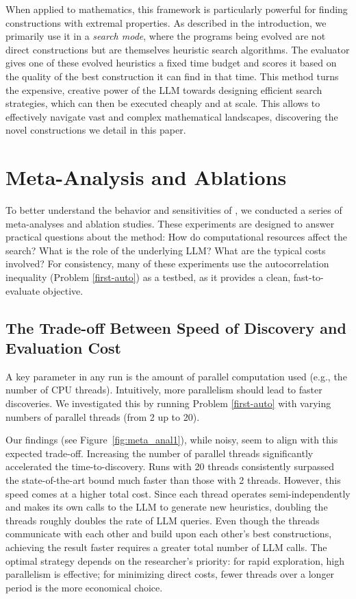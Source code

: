 When applied to mathematics, this framework is particularly powerful for finding constructions with extremal properties. As described in the introduction, we primarily use it in a \emph{search mode}, where the programs being evolved are not direct constructions but are themselves heuristic search algorithms. The evaluator gives one of these evolved heuristics a fixed time budget and scores it based on the quality of the best construction it can find in that time. This method turns the expensive, creative power of the LLM towards designing efficient search strategies, which can then be executed cheaply and at scale. This allows \AlphaEvolve to effectively navigate vast and complex mathematical landscapes, discovering the novel constructions we detail in this paper.




\section{Meta-Analysis and Ablations}



To better understand the behavior and sensitivities of \AlphaEvolve, we conducted a series of meta-analyses and ablation studies. These experiments are designed to answer practical questions about the method: How do computational resources affect the search? What is the role of the underlying LLM? What are the typical costs involved? For consistency, many of these experiments use the  autocorrelation inequality  (Problem \ref{first-auto}) as a testbed, as it provides a clean, fast-to-evaluate objective.


\subsection{The Trade-off Between Speed of Discovery and Evaluation Cost}

A key parameter in any \AlphaEvolve run is the amount of parallel computation used (e.g., the number of CPU threads). Intuitively, more parallelism should lead to faster discoveries. We investigated this by running Problem \ref{first-auto} with varying numbers of parallel threads (from 2 up to 20).

Our findings (see Figure~\ref{fig:meta_anal1}), while noisy, seem to align with this expected trade-off. Increasing the number of parallel threads significantly accelerated the time-to-discovery. Runs with 20 threads consistently surpassed the state-of-the-art bound much faster than those with 2 threads. However, this speed comes at a higher total cost. Since each thread operates semi-independently and makes its own calls to the LLM to generate new heuristics, doubling the threads roughly doubles the rate of LLM queries. Even though the threads communicate with each other and build upon each other's best constructions, achieving the result faster requires a greater total number of LLM calls. The optimal strategy depends on the researcher's priority: for rapid exploration, high parallelism is effective; for minimizing direct costs, fewer threads over a longer period is the more economical choice. 

